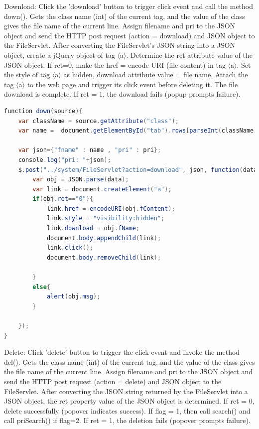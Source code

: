 \documentclass[a4paper,11pt]{article}
\begin{document}
\begin{itemize}
\par Download: Click the 'download' button to trigger click event and call the method down(). Gets the class name (int) of the current tag, and the value of the class gives the file name of the current line. Assign filename and pri to the JSON object and send the HTTP post request (action = download) and JSON object to the FileServlet. After converting the FileServlet's JSON string into a JSON object, create a jQuery object of tag {$\langle$}a{$\rangle$}. Determine the ret attribute value of the JSON object. If ret=0, make the href = encode URI (file content) in tag {$\langle$}a{$\rangle$}. Set the style of tag {$\langle$}a{$\rangle$} as hidden, download attribute value = file name. Attach the tag {$\langle$}a{$\rangle$} to the web page and trigger its click event before deleting it. The file download is complete. If ret = 1, the download fails (popup prompts failure).

\begin{lstlisting}[language=Java]
function down(source){
	var className = source.getAttribute("class");
	var name =  document.getElementById("tab").rows[parseInt(className) + 1].cells[0].innerHTML;
	
	var json={"fname" : name , "pri" : pri};
	console.log("pri: "+json);
	$.post("../system/FileServlet?action=download", json, function(data) {
		var obj = JSON.parse(data);
		var link = document.createElement("a");
		if(obj.ret=="0"){
			link.href = encodeURI(obj.fContent);
			link.style = "visibility:hidden";
        	link.download = obj.fName;
        	document.body.appendChild(link);
        	link.click();
        	document.body.removeChild(link);

		}
		else{
			alert(obj.msg);
		}
       
	});
}
\end{lstlisting}

\par Delete: Click 'delete' button to trigger the click event and invoke the method del(). Gets the class name (int) of the current tag, and the value of the class gives the file name of the current line. Assign filename and pri to the JSON object and send the HTTP post request (action = delete) and JSON object to the FileServlet. After converting the JSON string returned by the FileServlet into a JSON object, the ret property value of the JSON object is determined. If ret = 0, delete successfully (popover indicates success). If flag = 1, then call search() and call priSearch() if flag=2. If ret = 1, the deletion fails (popover prompts failure).


\end{itemize}
\end{document}
